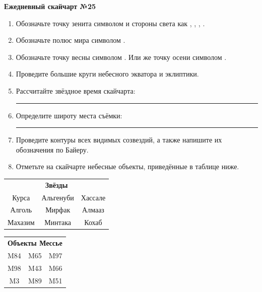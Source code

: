 \documentclass{./SAS-class-skygen}
\begin{document}
    
    
    
	\begin{center}
		\large\textbf{Ежедневный скайчарт №25}
	\end{center}

	\begin{enumerate}
		\item Обозначьте точку зенита символом  и стороны света как , , , .
		\item Обозначьте полюс мира символом .
		\item Обозначьте точку весны символом \Aries. Или же точку осени символом \Libra.
		\item Проведите большие круги небесного экватора и эклиптики.
		\item Рассчитайте звёздное время скайчарта: \rule{2cm}{0.4pt}
		\item Определите широту места съёмки: \rule{2cm}{0.4pt}
		\item Проведите контуры всех видимых созвездий, а также напишите их обозначения по Байеру.
		\item Отметьте на скайчарте небесные объекты, приведённые в таблице ниже.
	\end{enumerate}
	
    \vspace{0.5cm}

    \begin{table}[h!]
    \centering
    \begin{tabular}{ccc}
    \multicolumn{3}{c}{\textbf{Звёзды}} \\ Курса & Альгенуби & Хассале \\
Алголь & Мирфак & Алмааз \\
Махазим & Минтака & Кохаб \\

\end{tabular}
    \hfill
    \begin{tabular}{ccc}
    \multicolumn{3}{c}{\textbf{Объекты Мессье}} \\ M84 & M65 & M97 \\
M98 & M43 & M66 \\
M3 & M89 & M51 \\

\end{tabular}
    \end{table}
	
\end{document}
